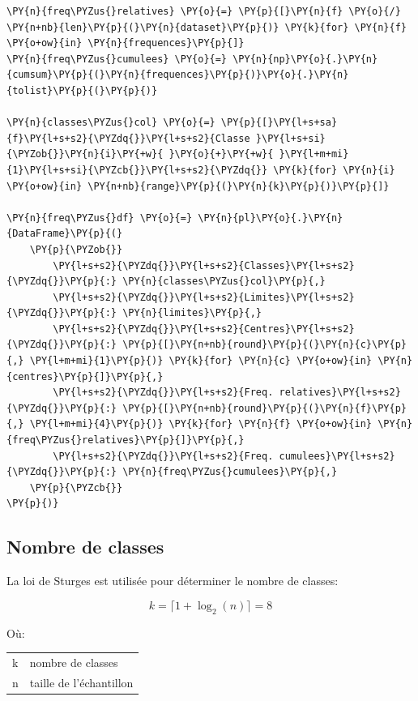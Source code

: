 \begin{tcolorbox}[breakable, size=fbox, boxrule=1pt, pad at break*=1mm,colback=cellbackground, colframe=cellborder]
\begin{Verbatim}[commandchars=\\\{\}]
\PY{n}{freq\PYZus{}relatives} \PY{o}{=} \PY{p}{[}\PY{n}{f} \PY{o}{/} \PY{n+nb}{len}\PY{p}{(}\PY{n}{dataset}\PY{p}{)} \PY{k}{for} \PY{n}{f} \PY{o+ow}{in} \PY{n}{frequences}\PY{p}{]}
\PY{n}{freq\PYZus{}cumulees} \PY{o}{=} \PY{n}{np}\PY{o}{.}\PY{n}{cumsum}\PY{p}{(}\PY{n}{frequences}\PY{p}{)}\PY{o}{.}\PY{n}{tolist}\PY{p}{(}\PY{p}{)}

\PY{n}{classes\PYZus{}col} \PY{o}{=} \PY{p}{[}\PY{l+s+sa}{f}\PY{l+s+s2}{\PYZdq{}}\PY{l+s+s2}{Classe }\PY{l+s+si}{\PYZob{}}\PY{n}{i}\PY{+w}{ }\PY{o}{+}\PY{+w}{ }\PY{l+m+mi}{1}\PY{l+s+si}{\PYZcb{}}\PY{l+s+s2}{\PYZdq{}} \PY{k}{for} \PY{n}{i} \PY{o+ow}{in} \PY{n+nb}{range}\PY{p}{(}\PY{n}{k}\PY{p}{)}\PY{p}{]}

\PY{n}{freq\PYZus{}df} \PY{o}{=} \PY{n}{pl}\PY{o}{.}\PY{n}{DataFrame}\PY{p}{(}
    \PY{p}{\PYZob{}}
        \PY{l+s+s2}{\PYZdq{}}\PY{l+s+s2}{Classes}\PY{l+s+s2}{\PYZdq{}}\PY{p}{:} \PY{n}{classes\PYZus{}col}\PY{p}{,}
        \PY{l+s+s2}{\PYZdq{}}\PY{l+s+s2}{Limites}\PY{l+s+s2}{\PYZdq{}}\PY{p}{:} \PY{n}{limites}\PY{p}{,}
        \PY{l+s+s2}{\PYZdq{}}\PY{l+s+s2}{Centres}\PY{l+s+s2}{\PYZdq{}}\PY{p}{:} \PY{p}{[}\PY{n+nb}{round}\PY{p}{(}\PY{n}{c}\PY{p}{,} \PY{l+m+mi}{1}\PY{p}{)} \PY{k}{for} \PY{n}{c} \PY{o+ow}{in} \PY{n}{centres}\PY{p}{]}\PY{p}{,}
        \PY{l+s+s2}{\PYZdq{}}\PY{l+s+s2}{Freq. relatives}\PY{l+s+s2}{\PYZdq{}}\PY{p}{:} \PY{p}{[}\PY{n+nb}{round}\PY{p}{(}\PY{n}{f}\PY{p}{,} \PY{l+m+mi}{4}\PY{p}{)} \PY{k}{for} \PY{n}{f} \PY{o+ow}{in} \PY{n}{freq\PYZus{}relatives}\PY{p}{]}\PY{p}{,}
        \PY{l+s+s2}{\PYZdq{}}\PY{l+s+s2}{Freq. cumulees}\PY{l+s+s2}{\PYZdq{}}\PY{p}{:} \PY{n}{freq\PYZus{}cumulees}\PY{p}{,}
    \PY{p}{\PYZcb{}}
\PY{p}{)}
\end{Verbatim}
\end{tcolorbox}

    \subsection{Nombre de classes}\label{nombre-de-classes}

La loi de Sturges est utilisée pour déterminer le nombre de classes:

\[
k = \lceil 1 + \log_2(n) \rceil = 8
\]

Où:

\begin{longtable}[]{@{}ll@{}}
\toprule\noalign{}
\endhead
\bottomrule\noalign{}
\endlastfoot
k & nombre de classes \\
n & taille de l'échantillon \\
\end{longtable}

